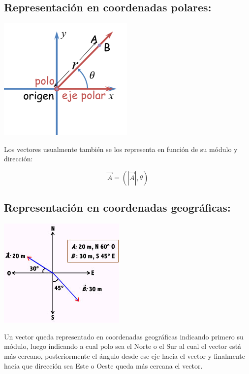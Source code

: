 \subsection{Representación en coordenadas polares:}

\begin{center}
 \includegraphics[scale = 0.77]{images/picture1-0.png}
\end{center}

Los vectores usualmente también se los representa en función de su módulo y dirección:

\begin{equation}
 \vec{A} = (|\vec{A}|, \theta)
\end{equation}

\subsection{Representación en coordenadas geográficas:}

\begin{center}
 \includegraphics[angle=0.5]{images/vector2.jpg}
\end{center}

Un vector queda representado en coordenadas geográficas indicando primero su módulo, luego indicando a cual polo sea el 
Norte o el Sur al cual el vector está más cercano, posteriormente el ángulo desde ese eje hacia el vector y finalmente 
hacia que dirección sea Este o Oeste queda más cercana el vector.

